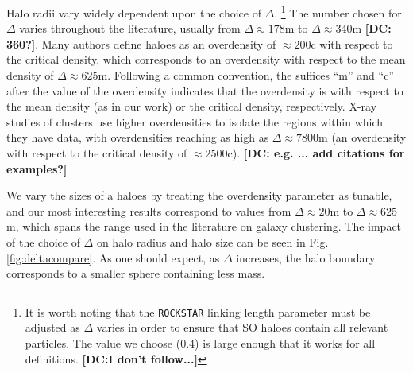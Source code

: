 \documentclass[usenatbib,fleqn]{mnras}
\begin{document}
Halo radii vary widely dependent upon the choice of $\Delta$. \footnote{It is worth noting that the {\tt ROCKSTAR} linking length parameter must be adjusted as $\Delta$ varies in order to ensure that SO haloes contain all relevant particles. The value we choose ($0.4$) is large enough that it works for all definitions. {\bf [DC:I don't follow...]}} The number chosen for $\Delta$ varies throughout the literature, usually from $\Delta \approx 178$m to $\Delta \approx 340$m {\bf [DC: 360?]}. Many authors define haloes as an overdensity of $\approx 200$c with respect to the critical density, which corresponds to an overdensity with respect to the mean density of $\Delta \approx 625$m. Following a common convention, the suffices ``m'' and ``c'' after the value of the overdensity indicates that the overdensity is with respect to the mean density (as in our work) or the critical density, respectively. X-ray studies of clusters use higher overdensities to isolate the regions within which they have data, with overdensities reaching as high as $\Delta \approx 7800$m (an overdensity with respect to the critical density of $\approx 2500$c). {\bf [DC: e.g. ... add citations for examples?]}

We vary the sizes of a haloes by treating the overdensity parameter as tunable, and our most interesting results correspond to values from $\Delta \approx 20$m to $\Delta \approx 625$m, which spans the range used in the literature on galaxy clustering. 
The impact of the choice of $\Delta$ on halo radius and halo size can be seen in Fig.~ \ref{fig:deltacompare}. As one should expect, as $\Delta$ increases, the halo boundary corresponds to a smaller sphere containing less mass. 
\end{document}
